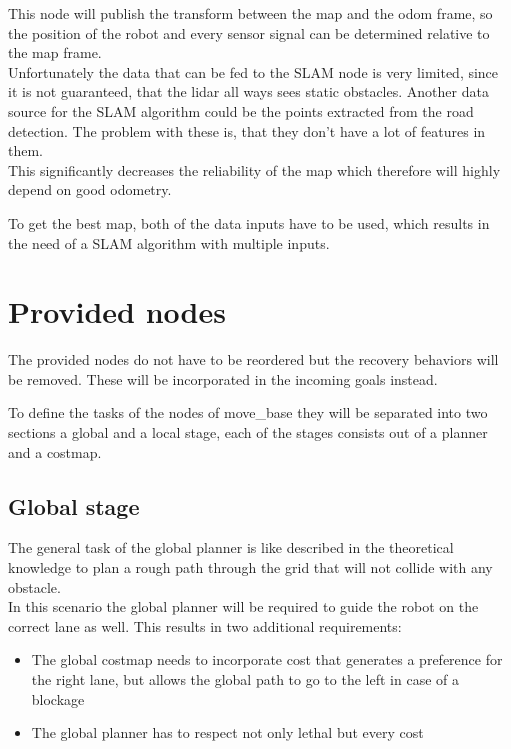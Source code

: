 This node will publish the transform between the map and the odom frame, so the position of the robot and every sensor signal can be determined relative to the map frame.\\

Unfortunately the data that can be fed to the SLAM node is very limited, since it is not guaranteed, that the lidar all ways sees static obstacles. Another data source for the SLAM algorithm could be the points extracted from the road detection. The problem with these is, that they don't have a lot of features in them.\\

This significantly decreases the reliability of the map which therefore will highly depend on good odometry.

To get the best map, both of the data inputs have to be used, which results in the need of a SLAM algorithm with multiple inputs.\\

\section{Provided nodes}

The provided nodes do not have to be reordered but the recovery behaviors will be removed. These will be incorporated in the incoming goals instead.

To define the tasks of the nodes of move\_base they will be separated into two sections a global and a local stage, each of the stages consists out of a planner and a costmap.\\
\subsection{Global stage}
The general task of the global planner is like described in the theoretical knowledge to plan a rough path through the grid that will not collide with any obstacle.\\

In this scenario the global planner will be required to guide the robot on the correct lane as well. This results in two additional requirements:

\begin{itemize}
	\item The global costmap needs to incorporate cost that generates a preference for the right lane, but allows the global path to go to the left in case of a blockage
	\item The global planner has to respect not only lethal but every cost
\end{itemize}

